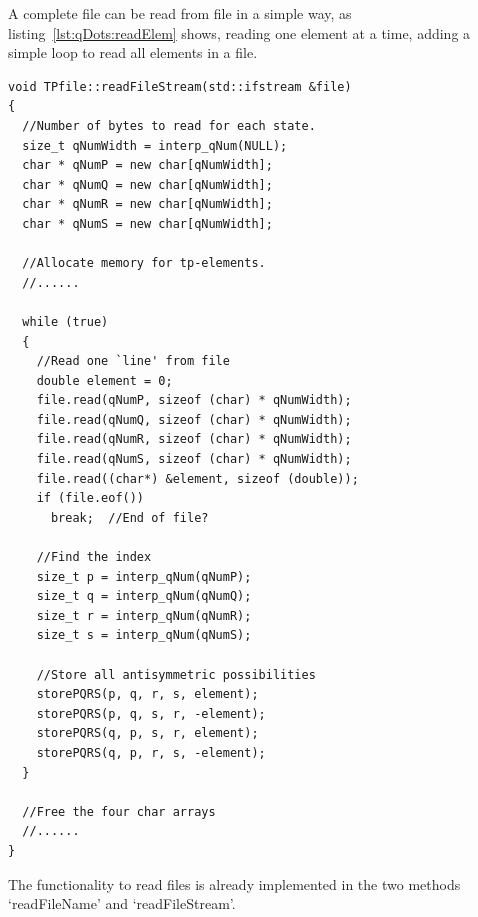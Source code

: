 A complete file can be read from file in a simple way, as listing~\ref{lst:qDots:readElem} shows, reading one element at a time, adding a  simple loop to read all elements in a file.
\begin{lstlisting}[float,label={lst:qDots:readElem},caption={How to read two-particle elements from file.}]
void TPfile::readFileStream(std::ifstream &file)
{
  //Number of bytes to read for each state.
  size_t qNumWidth = interp_qNum(NULL);
  char * qNumP = new char[qNumWidth];
  char * qNumQ = new char[qNumWidth];
  char * qNumR = new char[qNumWidth];
  char * qNumS = new char[qNumWidth];

  //Allocate memory for tp-elements.
  //......

  while (true)
  {
    //Read one `line' from file
    double element = 0;
    file.read(qNumP, sizeof (char) * qNumWidth);
    file.read(qNumQ, sizeof (char) * qNumWidth);
    file.read(qNumR, sizeof (char) * qNumWidth);
    file.read(qNumS, sizeof (char) * qNumWidth);
    file.read((char*) &element, sizeof (double));
    if (file.eof())
      break;  //End of file?

	//Find the index
    size_t p = interp_qNum(qNumP);
    size_t q = interp_qNum(qNumQ);
    size_t r = interp_qNum(qNumR);
    size_t s = interp_qNum(qNumS);

    //Store all antisymmetric possibilities 
    storePQRS(p, q, r, s, element);
    storePQRS(p, q, s, r, -element);
    storePQRS(q, p, s, r, element);
    storePQRS(q, p, r, s, -element);
  }

  //Free the four char arrays
  //......
}
\end{lstlisting}
The functionality to read files is already implemented in the two methods `readFileName' and `readFileStream'.







